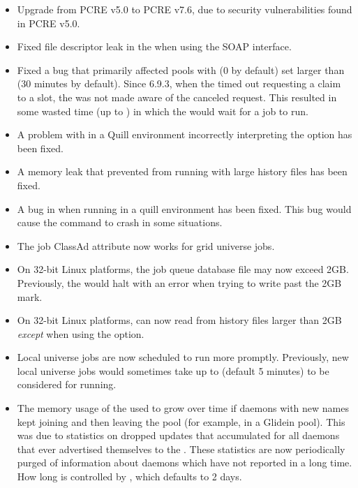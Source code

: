 \begin{itemize}

\item Upgrade from PCRE v5.0 to PCRE v7.6, due to security vulnerabilities 
found in PCRE v5.0.

\item Fixed file descriptor leak in the  when using the SOAP
interface.

\item Fixed a bug that primarily affected pools with
 (0 by default) set larger than
 (30 minutes by default).  Since
6.9.3, when the  timed out requesting a claim to a slot, the
 was not made aware of the canceled request.  This
resulted in some wasted time (up to ) in
which the  would wait for a job to run.

\item A problem with  in a Quill environment incorrectly
interpreting the  option has been fixed.

\item A memory leak that prevented  from running
with large history files has been fixed.

\item A bug in  when running in a quill environment has been fixed.  This bug would cause the command to crash in some situations.

\item The job ClassAd attribute  now works 
for grid universe jobs.

\item On 32-bit Linux platforms, the job queue database file may now exceed 2GB.
Previously, the  would halt with an error when trying
to write past the 2GB mark.

\item On 32-bit Linux platforms,  can now read from history
files larger than 2GB \emph{except} when using the  option.

\item Local universe jobs are now scheduled to run more promptly.  Previously,
new local universe jobs would sometimes take up to 
(default 5 minutes) to be considered for running.

\item The memory usage of the  used to grow over time if
daemons with new names kept joining and then leaving the pool
(for example, in a Glidein pool).
This was due to statistics on dropped updates that
accumulated for all daemons that ever advertised themselves to the
.  These statistics are now periodically purged of
information about daemons which have not reported in a long time.  How
long is controlled by , which
defaults to 2 days.


\end{itemize}
